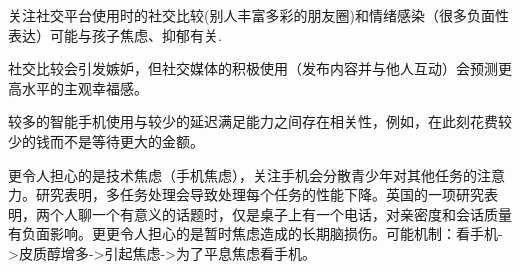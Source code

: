 关注社交平台使用时的社交比较(别人丰富多彩的朋友圈)和情绪感染（很多负面性表达）可能与孩子焦虑、抑郁有关.


社交比较会引发嫉妒，但社交媒体的积极使用（发布内容并与他人互动）会预测更高水平的主观幸福感。

 
 较多的智能手机使用与较少的延迟满足能力之间存在相关性，例如，在此刻花费较少的钱而不是等待更大的金额。


更令人担心的是技术焦虑（手机焦虑），关注手机会分散青少年对其他任务的注意力。研究表明，多任务处理会导致处理每个任务的性能下降。英国的一项研究表明，两个人聊一个有意义的话题时，仅是桌子上有一个电话，对亲密度和会话质量有负面影响。更更令人担心的是暂时焦虑造成的长期脑损伤。可能机制：看手机->皮质醇增多->引起焦虑->为了平息焦虑看手机。

